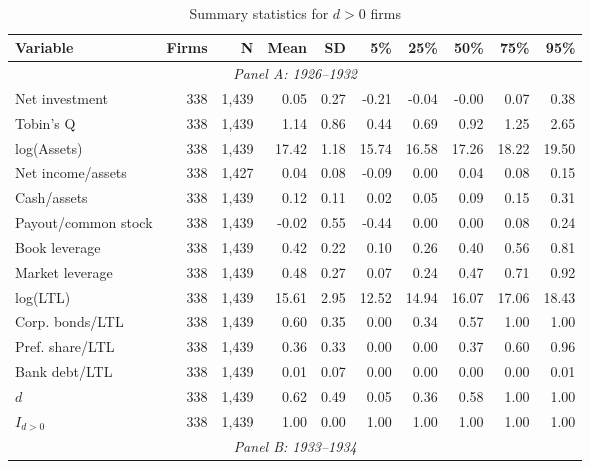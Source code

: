 \begin{table}[p]\centering
    \caption{\\ Summary statistics for $d > 0$ firms}\scriptsize
    \label{tabapp:summary_d_1}
    \begin{threeparttable}
        \begin{tabular}{lrrrrrrrrr}
            \toprule
            Variable & Firms & N & Mean & SD & 5\% & 25\% & 50\% & 75\% & 95\% \\
            \midrule
            \multicolumn{10}{c}{\textit{Panel A: 1926--1932}} \\
            \midrule
            Net investment & 338 & 1,439 & 0.05 & 0.27 & -0.21 & -0.04 & -0.00 & 0.07 & 0.38 \\
            Tobin's Q & 338 & 1,439 & 1.14 & 0.86 & 0.44 & 0.69 & 0.92 & 1.25 & 2.65 \\
            log(Assets) & 338 & 1,439 & 17.42 & 1.18 & 15.74 & 16.58 & 17.26 & 18.22 & 19.50 \\
            Net income/assets & 338 & 1,427 & 0.04 & 0.08 & -0.09 & 0.00 & 0.04 & 0.08 & 0.15 \\
            Cash/assets & 338 & 1,439 & 0.12 & 0.11 & 0.02 & 0.05 & 0.09 & 0.15 & 0.31 \\
            Payout/common stock & 338 & 1,439 & -0.02 & 0.55 & -0.44 & 0.00 & 0.00 & 0.08 & 0.24 \\
            Book leverage & 338 & 1,439 & 0.42 & 0.22 & 0.10 & 0.26 & 0.40 & 0.56 & 0.81 \\
            Market leverage & 338 & 1,439 & 0.48 & 0.27 & 0.07 & 0.24 & 0.47 & 0.71 & 0.92 \\
            log(LTL) & 338 & 1,439 & 15.61 & 2.95 & 12.52 & 14.94 & 16.07 & 17.06 & 18.43 \\
            Corp. bonds/LTL & 338 & 1,439 & 0.60 & 0.35 & 0.00 & 0.34 & 0.57 & 1.00 & 1.00 \\
            Pref. share/LTL & 338 & 1,439 & 0.36 & 0.33 & 0.00 & 0.00 & 0.37 & 0.60 & 0.96 \\
            Bank debt/LTL & 338 & 1,439 & 0.01 & 0.07 & 0.00 & 0.00 & 0.00 & 0.00 & 0.01 \\
            \ensuremath{d} & 338 & 1,439 & 0.62 & 0.49 & 0.05 & 0.36 & 0.58 & 1.00 & 1.00 \\
            \ensuremath{I_{d>0}} & 338 & 1,439 & 1.00 & 0.00 & 1.00 & 1.00 & 1.00 & 1.00 & 1.00 \\
            \midrule
            \multicolumn{10}{c}{\textit{Panel B: 1933--1934}} \\

\end{tabular}
\end{threeparttable}
\end{table}
